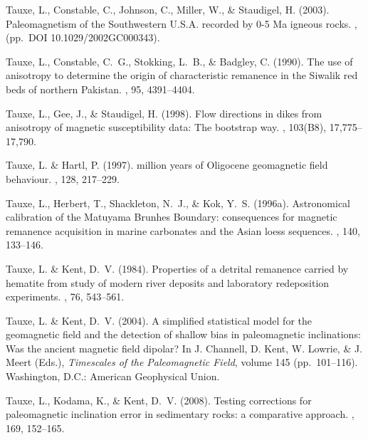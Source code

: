 Tauxe, L., Constable, C., Johnson, C., Miller, W., \& Staudigel, H. (2003).
\newblock Paleomagnetism of the Southwestern U.S.A. recorded by 0-5 Ma igneous
  rocks.
, (pp.\ DOI 10.1029/2002GC000343).

Tauxe, L., Constable, C.~G., Stokking, L.~B., \& Badgley, C. (1990).
\newblock The use of anisotropy to determine the origin of characteristic
  remanence in the Siwalik red beds of northern Pakistan.
, 95, 4391--4404.

Tauxe, L., Gee, J., \& Staudigel, H. (1998).
\newblock Flow directions in dikes from anisotropy of magnetic susceptibility
  data: The bootstrap way.
, 103(B8), 17,775--17,790.

Tauxe, L. \& Hartl, P. (1997).
 million years of Oligocene geomagnetic field behaviour.
, 128, 217--229.

Tauxe, L., Herbert, T., Shackleton, N.~J., \& Kok, Y.~S. (1996a).
\newblock Astronomical calibration of the Matuyama Brunhes Boundary:
  consequences for magnetic remanence acquisition in marine carbonates and the
  Asian loess sequences.
, 140, 133--146.

Tauxe, L. \& Kent, D.~V. (1984).
\newblock Properties of a detrital remanence carried by hematite from study of
  modern river deposits and laboratory redeposition experiments.
, 76, 543--561.

Tauxe, L. \& Kent, D.~V. (2004).
\newblock A simplified statistical model for the geomagnetic field and the
  detection of shallow bias in paleomagnetic inclinations: Was the ancient
  magnetic field dipolar?
\newblock In J. Channell, D. Kent, W. Lowrie, \& J. Meert (Eds.), {\em
  Timescales of the Paleomagnetic Field}, volume 145  (pp.\ 101--116).
  Washington, D.C.: American Geophysical Union.

Tauxe, L., Kodama, K., \& Kent, D.~V. (2008).
\newblock Testing corrections for paleomagnetic inclination error in
  sedimentary rocks: a comparative approach.
, 169, 152--165.

